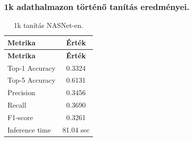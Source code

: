   \subsubsection{1k adathalmazon történő tanítás eredményei.}
    \begin{center}
      \begin{longtable}{l c}
      \caption{1k tanítás NASNet-en.} \label{tab:phase03_NASNet_1k} \\
      \toprule
      \textbf{Metrika} & \textbf{Érték} \\
      \midrule
      \endfirsthead
      \toprule
      \textbf{Metrika} & \textbf{Érték} \\
      \midrule
      \endhead
      Top-1 Accuracy & 0.3324 \\
      Top-5 Accuracy & 0.6131 \\
      Precision      & 0.3456 \\
      Recall         & 0.3690 \\
      F1-score       & 0.3261 \\
      Inference time & 81.04 sec \\
      \bottomrule
      \end{longtable}
    \end{center}

